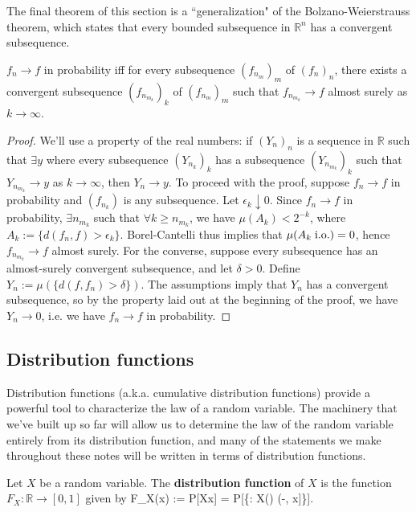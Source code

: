 The final theorem of this section is a ``generalization" of the Bolzano-Weierstrauss theorem, which states that every bounded subsequence in $\mathbb R^n$ has a convergent subsequence. 
\begin{theorem}
	$f_n\longrightarrow f$ in probability iff for every subsequence $(f_{n_m})_m$ of $(f_n)_n$, there exists a convergent subsequence $(f_{n_{m_k}})_k$ of $(f_{n_m})_m$ such that $f_{n_{m_k}}\longrightarrow f$ almost surely as $k\rightarrow\infty$. 
\end{theorem}
\begin{proof}
	We'll use a property of the real numbers: if $(Y_n)_n$ is a sequence in $\mathbb R$ such that $\exists y$ where every subsequence $(Y_{n_k})_k$ has a subsequence $(Y_{n_{m_k}})_k$ such that $Y_{n_{m_k}}\longrightarrow y$ as $k\rightarrow\infty$, then $Y_n\longrightarrow y$. To proceed with the proof, suppose $f_n\longrightarrow f$ in probability and $(f_{n_k})$ is any subsequence. Let $\epsilon_k\downarrow 0$. Since $f_n\longrightarrow f$ in probability, $\exists n_{m_k}$ such that $\forall k\geq n_{m_k}$, we have $\mu(A_k) < 2^{-k}$, where $A_k := \{d(f_n, f) > \epsilon_k\}$. Borel-Cantelli thus implies that $\mu(A_k\;\mathrm{i.o.}) = 0$, hence $f_{n_{m_k}}\longrightarrow f$ almost surely. For the converse, suppose every subsequence has an almost-surely convergent subsequence, and let $\delta > 0$. Define $Y_n := \mu(\{d(f, f_n) > \delta\})$. The assumptions imply that $Y_n$ has a convergent subsequence, so by the property laid out at the beginning of the proof, we have $Y_n\rightarrow 0$, i.e. we have $f_n\rightarrow f$ in probability. 
\end{proof}

\subsection{Distribution functions}

Distribution functions (a.k.a. cumulative distribution functions) provide a powerful tool to characterize the law of a random variable. The machinery that we've built up so far will allow us to determine the law of the random variable entirely from its distribution function, and many of the statements we make throughout these notes will be written in terms of distribution functions. 

\begin{definition}
	Let $X$ be a random variable. The \textbf{distribution function} of $X$ is the function $F_X : \mathbb R\rightarrow [0, 1]$ given by
	\eq
		F_X(x) := \mathbb P[X\leq x] = \mathbb P[\{\omega\in\Omega : X(\omega) \in (-\infty, x]\}].
	\qe
\end{definition}


